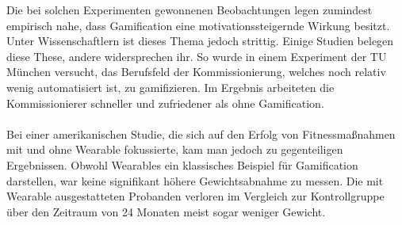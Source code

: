 Die bei solchen Experimenten gewonnenen Beobachtungen legen zumindest empirisch nahe, dass Gamification eine motivationssteigernde Wirkung besitzt. Unter Wissenschaftlern ist dieses Thema jedoch strittig. Einige Studien belegen diese These, andere widersprechen ihr. So wurde in einem Experiment der TU München versucht, das Berufsfeld der Kommissionierung, welches noch relativ wenig automatisiert ist, zu gamifizieren. Im Ergebnis arbeiteten die Kommissionierer schneller und zufriedener als ohne Gamification. \cite{Src:WwieWissen} \\ \\
Bei einer amerikanischen Studie, die sich auf den Erfolg von Fitnessmaßnahmen mit und ohne Wearable fokussierte, kam man jedoch zu gegenteiligen Ergebnissen. Obwohl Wearables ein klassisches Beispiel für Gamification darstellen, war keine signifikant höhere Gewichtsabnahme zu messen. Die mit Wearable ausgestatteten Probanden verloren im Vergleich zur Kontrollgruppe über den Zeitraum von 24 Monaten meist sogar weniger Gewicht. \cite{Src:WearableMotiv}
